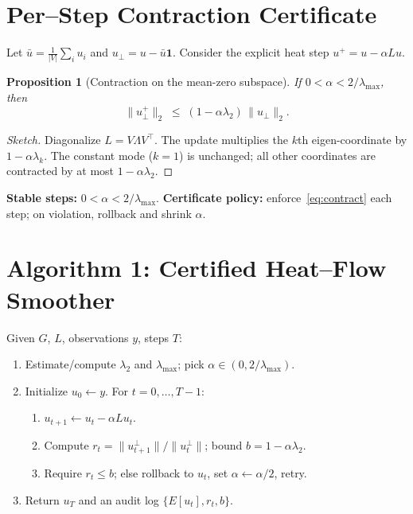 \documentclass[11pt]{article}
\newtheorem{proposition}{Proposition}
\begin{document}
\section{Per--Step Contraction Certificate}
Let $\bar u=\tfrac{1}{|V|}\sum_i u_i$ and $u_\perp=u-\bar u\mathbf 1$. Consider the explicit heat step $u^+=u-\alpha L u$.
\begin{proposition}[Contraction on the mean-zero subspace]
If $0<\alpha<2/\lambda_{\max}$, then
\begin{equation}
\|u_\perp^+\|_2\;\le\; (1-\alpha\lambda_2)\,\|u_\perp\|_2.\label{eq:contract}
\end{equation}
\end{proposition}
\begin{proof}[Sketch]
Diagonalize $L=V\Lambda V^\top$. The update multiplies the $k$th eigen-coordinate by $1-\alpha\lambda_k$. The constant mode ($k=1$) is unchanged; all other coordinates are contracted by at most $1-\alpha\lambda_2$.
\end{proof}
\noindent \textbf{Stable steps:} $0<\alpha<2/\lambda_{\max}$. \; \textbf{Certificate policy:} enforce~\eqref{eq:contract} each step; on violation, rollback and shrink $\alpha$.

\section{Algorithm 1: Certified Heat--Flow Smoother}
Given $G$, $L$, observations $y$, steps $T$:
\begin{enumerate}[leftmargin=1.2em]
  \item Estimate/compute $\lambda_2$ and $\lambda_{\max}$; pick $\alpha\in(0,2/\lambda_{\max})$.
  \item Initialize $u_0\leftarrow y$. For $t=0,\dots,T-1$:
  \begin{enumerate}
    \item $u_{t+1}\leftarrow u_t-\alpha L u_t$.
    \item Compute $r_t=\|u_{t+1}^\perp\|/\|u_t^\perp\|$; bound $b=1-\alpha\lambda_2$.
    \item Require $r_t\le b$; else rollback to $u_t$, set $\alpha\leftarrow\alpha/2$, retry.
  \end{enumerate}
  \item Return $u_T$ and an audit log $\{E[u_t], r_t, b\}$.
\end{enumerate}
\end{document}

